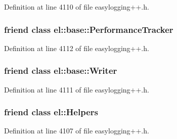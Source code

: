 Definition at line 4110 of file easylogging++.\+h.

\hypertarget{classel_1_1base_1_1_storage_a6a4d7851e1984800be3c230f06a79528}{}
\subsubsection[{el\+::base\+::\+Performance\+Tracker}]{\setlength{\rightskip}{0pt plus 5cm}friend class {\bf el\+::base\+::\+Performance\+Tracker}\hspace{0.3cm}{\ttfamily [friend]}}\label{classel_1_1base_1_1_storage_a6a4d7851e1984800be3c230f06a79528}


Definition at line 4112 of file easylogging++.\+h.

\hypertarget{classel_1_1base_1_1_storage_a7a728edbb2761d151832daa74d5b2736}{}
\subsubsection[{el\+::base\+::\+Writer}]{\setlength{\rightskip}{0pt plus 5cm}friend class {\bf el\+::base\+::\+Writer}\hspace{0.3cm}{\ttfamily [friend]}}\label{classel_1_1base_1_1_storage_a7a728edbb2761d151832daa74d5b2736}


Definition at line 4111 of file easylogging++.\+h.

\hypertarget{classel_1_1base_1_1_storage_a2fb8a2c02cbf86247f093c118bed877a}{}
\subsubsection[{el\+::\+Helpers}]{\setlength{\rightskip}{0pt plus 5cm}friend class {\bf el\+::\+Helpers}\hspace{0.3cm}{\ttfamily [friend]}}\label{classel_1_1base_1_1_storage_a2fb8a2c02cbf86247f093c118bed877a}


Definition at line 4107 of file easylogging++.\+h.

